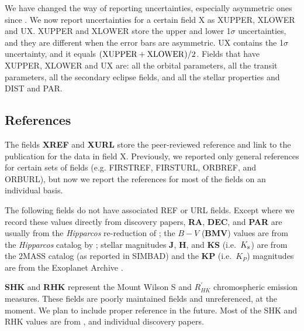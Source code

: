 \documentclass[11pt,preprint]{aastex}
\begin{document}
\begin{CJK*}{UTF8}{gbsn}
We have changed the way of reporting uncertainties, especially
asymmetric ones since \cite{Wright2011}. We now report
uncertainties for a certain field X as XUPPER, XLOWER and UX. XUPPER
and XLOWER store the upper and lower 1$\sigma$ uncertainties, and they
are different when the error bars are asymmetric. UX contains the
1$\sigma$ uncertainty, and it equals $({\rm XUPPER+XLOWER})/2$. Fields
that have XUPPER, XLOWER and UX are: all the orbital parameters, all
the transit parameters, all the secondary eclipse fields, and all the stellar
properties and DIST and PAR.

\begin{comment}
If only an upper limit is given, we set the parameter field X to 0,
and store the upper limit value in the field XUL. The uncertainty UX
is set to half of the upper limit, and the upper error bar XUPPER to
the upper limit value. For example, if the literature reports the
upper limit for ECC, which we report in ECCUL, then we set ECC to be
0, ECCUPPER to ECCUL, and UECC to ECCUL/2.  We are currently
implementing a more precise upper limit scheme (see
Section~\ref{sec:summary}.)
\end{comment}

\subsection{References}\label{sec:ref}

The fields {\bf XREF} and {\bf XURL} store the peer-reviewed reference
and link to the publication for the data in field X. Previously, we 
reported only general references for certain sets of fields (e.g. FIRSTREF,
FIRSTURL, ORBREF, and ORBURL), but now we report the references for
most of the fields on an individual basis.

The following fields do not have associated REF or URL fields. Except
where we record these values directly from discovery papers, {\bf RA},
{\bf DEC}, and {\bf PAR} are usually from the \textit{Hipparcos}
re-reduction of \cite{van Leeuwen2009}; the $B-V$ ({\bf BMV}) values
are from the \textit{Hipparcos} catalog by \cite{Perryman1997};
stellar magnitudes {\bf J}, {\bf H}, and {\bf KS} (i.e.\ $K_{\rm s}$)
are from the 2MASS catalog \citep{Skrutskie2006} (as reported in
SIMBAD) and the {\bf KP} (i.e.\ $K_P$) magnitudes are from the
Exoplanet Archive \citep{Akeson2013}.

{\bf SHK} and {\bf RHK} represent the Mount Wilson S and
$R^\prime_{HK}$ chromospheric
emission measures.  These fields are poorly maintained fields and
unreferenced, at the moment. We plan to include proper reference in
the future. Most of the SHK and RHK values are from \cite{Butler2006},
and individual discovery papers. 


\end{CJK*}
\end{document}
